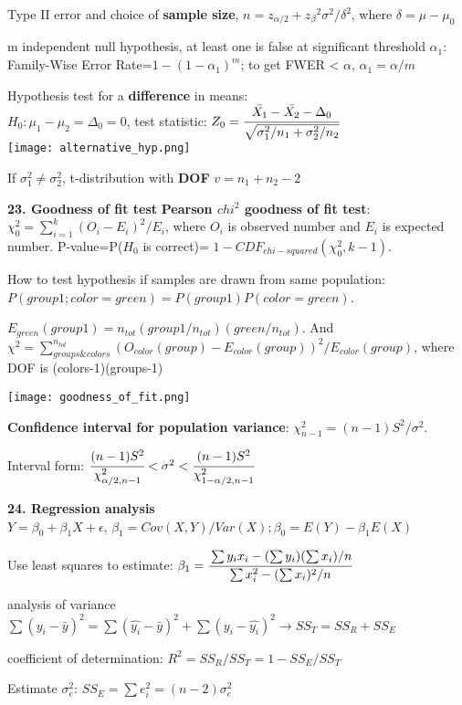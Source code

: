 \documentclass[a4paper,10pt,twocolumn]{article}
\begin{document}
Type II error and choice of \textbf{sample size}, $n={z_{\alpha/2}+z_\beta}^2\sigma^2/\delta^2$, where $\delta=\mu-\mu_0$

m independent null hypothesis, at least one is false at significant threshold $\alpha_1$: Family-Wise Error Rate=$1-(1-\alpha_1)^m$; to get FWER < $\alpha$, $\alpha_1=\alpha/m$

Hypothesis test for a \textbf{difference} in means:\\
$H_0:\mu_1-\mu_2=\Delta_0=0$, test statistic: $Z_0=\cfrac{\bar{X_1}-\bar{X_2}-\Delta_0}{\sqrt{\sigma_1^2/n_1+\sigma_2^2/n_2}}$\\
\texttt{[image: alternative\_hyp.png]}

If $\sigma_1^2\ne \sigma_2^2$, t-distribution with \textbf{DOF} $v=n_1+n_2-2$

\textbf{23. Goodness of fit test}
\textbf{Pearson $chi^2$ goodness of fit test}: $\chi_0^2=\sum_{i=1}^k(O_i-E_i)^2/E_i$, where $O_i$ is observed number and $E_i$ is expected number. P-value=P($H_0$ is correct)= $1-CDF_{chi-squared}(\chi_0^2, k-1)$.

How to test hypothesis if samples are drawn from same population: $P(group1;color=green)=P(group1)P(color=green)$.

$E_{green}(group1)=n_{tot}(group1/n_{tot})(green/n_{tot})$. And $\chi^2=\sum_{groups\&colors}^{n_{tot}}(O_{color}(group)-E_{color}(group))^2/E_{color}(group)$, where DOF is (colors-1)(groups-1)

\texttt{[image: goodness\_of\_fit.png]}

\textbf{Confidence interval for population variance}: $\chi_{n-1}^2=(n-1)S^2/\sigma^2$. 

Interval form: $\cfrac{(n-1)S^2}{\chi_{\alpha/2,n-1}^2}<\sigma^2<\cfrac{(n-1)S^2}{\chi_{1-\alpha/2,n-1}^2}$

\textbf{24. Regression analysis}\\
$Y=\beta_0+\beta_1X+\epsilon$, $\beta_1=Cov(X,Y)/Var(X);\beta_0=E(Y)-\beta_1E(X)$

Use least squares to estimate: $\beta_1=\cfrac{\sum y_ix_i-(\sum y_i)(\sum x_i)/n}{\sum x_i^2-(\sum x_i)^2/n}$

analysis of variance $\sum(y_i-\bar{y})^2=\sum(\hat{y_i}-\bar{y})^2+\sum(y_i-\hat{y_i})^2\rightarrow SS_T=SS_R+SS_E$

coefficient of determination: $R^2=SS_R/SS_T=1-SS_E/SS_T$

Estimate $\sigma_e^2$: $SS_E=\sum e_i^2=(n-2)\sigma_e^2$
\end{document}
